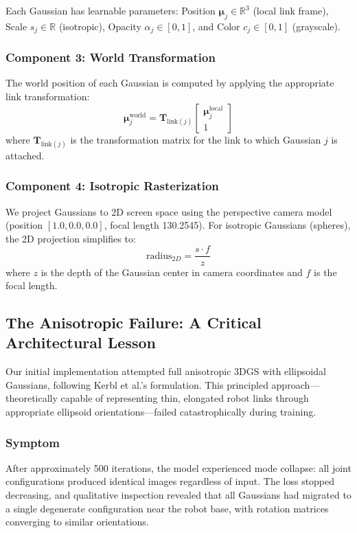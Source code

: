 \documentclass[12pt,a4paper,oneside]{report}
\begin{document}
Each Gaussian has learnable parameters: Position $\boldsymbol{\mu}_j \in \mathbb{R}^3$ (local link frame), Scale $s_j \in \mathbb{R}$ (isotropic), Opacity $\alpha_j \in [0, 1]$, and Color $c_j \in [0, 1]$ (grayscale).

\subsubsection{Component 3: World Transformation}
The world position of each Gaussian is computed by applying the appropriate link transformation:
\begin{equation}
\boldsymbol{\mu}_j^{\text{world}} = \mathbf{T}_{\text{link}(j)} \begin{bmatrix} \boldsymbol{\mu}_j^{\text{local}} \\ 1 \end{bmatrix}
\end{equation}
where $\mathbf{T}_{\text{link}(j)}$ is the transformation matrix for the link to which Gaussian $j$ is attached.

\subsubsection{Component 4: Isotropic Rasterization}
We project Gaussians to 2D screen space using the perspective camera model (position $[1.0, 0.0, 0.0]$, focal length 130.2545). For isotropic Gaussians (spheres), the 2D projection simplifies to:
\begin{equation}
\text{radius}_{2D} = \frac{s \cdot f}{z}
\end{equation}
where $z$ is the depth of the Gaussian center in camera coordinates and $f$ is the focal length.

\subsection{The Anisotropic Failure: A Critical Architectural Lesson}
Our initial implementation attempted full anisotropic 3DGS with ellipsoidal Gaussians, following Kerbl et al.'s formulation. This principled approach---theoretically capable of representing thin, elongated robot links through appropriate ellipsoid orientations---failed catastrophically during training.

\subsubsection{Symptom}
After approximately 500 iterations, the model experienced mode collapse: all joint configurations produced identical images regardless of input. The loss stopped decreasing, and qualitative inspection revealed that all Gaussians had migrated to a single degenerate configuration near the robot base, with rotation matrices converging to similar orientations.
\end{document}
